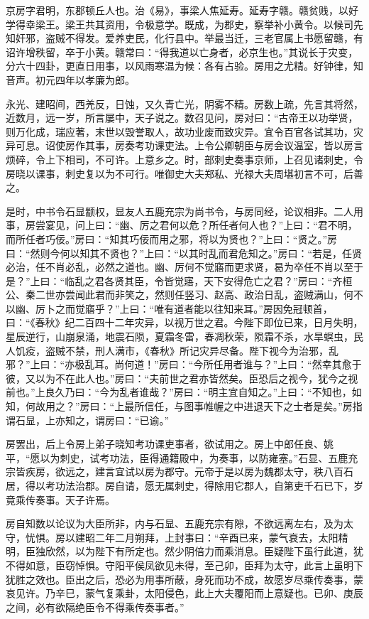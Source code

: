 \documentclass[12pt,UTF8]{ctexbook}
\begin{document}
京房字君明，东郡顿丘人也。治《易》，事梁人焦延寿。延寿字赣。赣贫贱，以好学得幸梁王。梁王共其资用，令极意学。既成，为郡史，察举补小黄令。以候司先知奸邪，盗贼不得发。爱养吏民，化行县中。举最当迁，三老官属上书愿留赣，有诏许增秩留，卒于小黄。赣常曰：“得我道以亡身者，必京生也。”其说长于灾变，分六十四卦，更直日用事，以风雨寒温为候：各有占验。房用之尤精。好钟律，知音声。初元四年以孝廉为郎。



永光、建昭间，西羌反，日蚀，又久青亡光，阴雾不精。房数上疏，先言其将然，近数月，远一岁，所言屡中，天子说之。数召见问，房对曰：“古帝王以功举贤，则万化成，瑞应著，末世以毁誉取人，故功业废而致灾异。宜令百官各试其功，灾异可息。诏使房作其事，房奏考功课吏法。上令公卿朝臣与房会议温室，皆以房言烦碎，令上下相司，不可许。上意乡之。时，部刺史奏事京师，上召见诸刺史，令房晓以课事，刺史复以为不可行。唯御史大夫郑私、光禄大夫周堪初言不可，后善之。



是时，中书令石显颛权，显友人五鹿充宗为尚书令，与房同经，论议相非。二人用事，房尝宴见，问上曰：“幽、厉之君何以危？所任者何人也？”上曰：“君不明，而所任者巧佞。”房曰：“知其巧佞而用之邪，将以为贤也？”上曰：“贤之。”房曰：“然则今何以知其不贤也？”上曰：“以其时乱而君危知之。”房曰：“若是，任贤必治，任不肖必乱，必然之道也。幽、厉何不觉寤而更求贤，曷为卒任不肖以至于是？”上曰：“临乱之君各贤其臣，令皆觉寤，天下安得危亡之君？”房曰：“齐桓公、秦二世亦尝闻此君而非笑之，然则任竖习、赵高、政治日乱，盗贼满山，何不以幽、厉卜之而觉寤乎？”上曰：“唯有道者能以往知来耳。”房因免冠顿首，曰：“《春秋》纪二百四十二年灾异，以视万世之君。今陛下即位已来，日月失明，星辰逆行，山崩泉涌，地震石陨，夏霜冬雷，春凋秋荣，陨霜不杀，水旱螟虫，民人饥疫，盗贼不禁，刑人满市，《春秋》所记灾异尽备。陛下视今为治邪，乱邪？”上曰：“亦极乱耳。尚何道！”房曰：“今所任用者谁与？”上曰：“然幸其愈于彼，又以为不在此人也。”房曰：“夫前世之君亦皆然矣。臣恐后之视今，犹今之视前也。”上良久乃曰：“今为乱者谁哉？”房曰：“明主宜自知之。”上曰：“不知也，如知，何故用之？”房曰：“上最所信任，与图事帷幄之中进退天下之士者是矣。”房指谓石显，上亦知之，谓房曰：“已谕。”



房罢出，后上令房上弟子晓知考功课吏事者，欲试用之。房上中郎任良、姚平，“愿以为刺史，试考功法，臣得通籍殿中，为奏事，以防雍塞。”石显、五鹿充宗皆疾房，欲远之，建言宜试以房为郡守。元帝于是以房为魏郡太守，秩八百石居，得以考功法治郡。房自请，愿无属刺史，得除用它郡人，自第吏千石已下，岁竟乘传奏事。天子许焉。



房自知数以论议为大臣所非，内与石显、五鹿充宗有隙，不欲远离左右，及为太守，忧惧。房以建昭二年二月朔拜，上封事曰：“辛酉已来，蒙气衰去，太阳精明，臣独欣然，以为陛下有所定也。然少阴倍力而乘消息。臣疑陛下虽行此道，犹不得如意，臣窃悼惧。守阳平侯凤欲见未得，至己卯，臣拜为太守，此言上虽明下犹胜之效也。臣出之后，恐必为用事所蔽，身死而功不成，故愿岁尽乘传奏事，蒙哀见许。乃辛巳，蒙气复乘卦，太阳侵色，此上大夫覆阳而上意疑也。已卯、庚辰之间，必有欲隔绝臣令不得乘传奏事者。”
\end{document}
